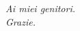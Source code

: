 
\vspace{5em}
\begin{flushright}
  {\normalsize \textit{Ai miei genitori.}}\\
  {\normalsize \textit{Grazie.}}\\
\end{flushright}

\clearpage{\pagestyle{empty}\cleardoublepage}
